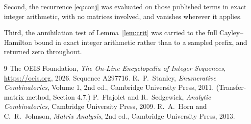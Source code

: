 \documentclass[11pt,a4paper]{article}
\theoremstyle{plain}
\theoremstyle{definition}
\begin{document}
Second, the recurrence \eqref{eq:conj} was evaluated on those published terms in exact
integer arithmetic, with no matrices involved, and vanishes wherever it applies.

Third, the annihilation test of Lemma~\ref{lem:crit} was carried to the full
Cayley--Hamilton bound in exact integer arithmetic rather than to a sampled prefix, and
returned zero throughout.

\begin{thebibliography}{9}
 The OEIS Foundation, \emph{The On-Line Encyclopedia of Integer
Sequences}, \url{https://oeis.org}, 2026. Sequence A297716.
 R.~P.~Stanley, \emph{Enumerative Combinatorics}, Volume 1, 2nd ed.,
Cambridge University Press, 2011. (Transfer-matrix method, Section 4.7.)
 P.~Flajolet and R.~Sedgewick, \emph{Analytic Combinatorics}, Cambridge
University Press, 2009.
 R.~A.~Horn and C.~R.~Johnson, \emph{Matrix Analysis}, 2nd ed., Cambridge
University Press, 2013.
\end{thebibliography}
\end{document}
